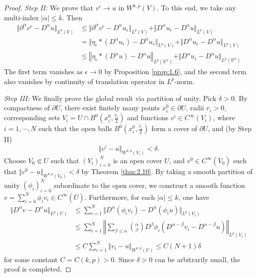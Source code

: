 \documentclass{article}
\numberwithin{equation}{section}
\newcommand{\bbR}{\mathbb{R}}
\newcommand{\ol}{\overline}
\theoremstyle{plain}
\theoremstyle{definition}
\begin{document}
\begin{proof}
\textit{Step II:} We prove that $v^\epsilon\to u$ in $W^{k,p}(V)$. To this end, we take any multi-index $\vert\alpha\vert\leq k$. Then
\begin{align*}
	\Vert\partial^\alpha v^\epsilon-D^\alpha u\Vert_{L^p(V)}&\leq\Vert\partial^\alpha v^\epsilon-D^\alpha u_\epsilon\Vert_{L^p(V)}+\Vert D^\alpha u_\epsilon-D^\alpha u\Vert_{L^p(V)}\\
	&=\Vert\eta_\epsilon*(D^\alpha u_\epsilon)-D^\alpha u_\epsilon\Vert_{L^p(V)}+\Vert D^\alpha u_\epsilon-D^\alpha u\Vert_{L^p(V)}\\
	&\leq\left\Vert\eta_\epsilon*(D^\alpha u)-D^\alpha u\right\Vert_{L^p(\bbR^n)}+\Vert D^\alpha u_\epsilon-D^\alpha u\Vert_{L^p(\bbR^n)}
\end{align*}
The first term vanishes as $\epsilon\to 0$ by Proposition \ref{prop:1.6}, and the second term also vanishes by continuity of translation operator in $L^p$-norm.\vspace{0.1cm}

\textit{Step III:} We finally prove the global result via partition of unity. Pick $\delta>0$. By compactness of $\partial U$, there exist finitely many points $x_i^0\in\partial U$, radii $r_i>0$, corresponding sets $V_i=U\cap B^0(x_i^0,\frac{r_i}{2})$ and functions $v^i\in C^\infty(V_i)$, where $i=1,\cdots,N$ such that the open balls $B^0(x_i^0,\frac{r_i}{2})$ form a cover of $\partial U$, and (by Step II) $$\Vert v^i-u\Vert_{W^{k,p}(V_i)}<\delta.$$ 
Choose $V_0\Subset U$ such that $(V_i)_{i=0}^N$ is an open cover $U$, and $v^0\in C^\infty(\ol{V}_0)$ such that $\Vert v^0-u\Vert_{W^{k,p}(V_0)}<\delta$ by Theorem \ref{thm:2.10}. By taking a smooth partition of unity $(\phi_i)_{i=0}^N$
subordinate to the open cover, we construct a smooth function $v=\sum_{i=0}^N\phi_iv_i\in C^\infty(\ol{U})$. Furthermore, for each $\vert\alpha\vert\leq k$, one have
\begin{align*}
	\Vert D^\alpha v-D^\alpha u\Vert_{L^p(U)}&\leq\sum_{i=1}^N\Vert D^\alpha(\phi_i v_i)-D^\alpha(\phi_i u)\Vert_{L^p(V_i)}\\
	&\leq\sum_{i=1}^N\left\Vert\sum_{\beta\leq\alpha}{\alpha\choose\beta}D^\beta\phi_i(D^{\alpha-\beta}v_i-D^{\alpha-\beta}u)\right\Vert_{L^p(V_i)}\\
	&\leq C\sum_{i=1}^N\Vert v_i-u\Vert_{W^{k,p}(U)}\leq C(N+1)\delta
\end{align*}
for some constant $C=C(k,p)>0$. Since $\delta>0$ can be arbitrarily small, the proof is completed.
\end{proof}
\end{document}
